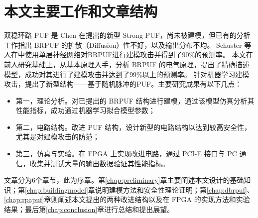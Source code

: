 \section{本文主要工作和文章结构}\label{sec:mainworks}
双稳环路 PUF 是 Chen 在\parencite{chen2011bistable}提出的新型 Strong PUF，尚未被建模，但已有的分析工作指出 BRPUF 的扩散（Diffusion）性不好，以及输出分布不均\supercite{chen2012characterization,yamamoto2014security}。
Schuster 等人在\parencite{schuster2014evaluation}中使用单层神经网络对BRPUF进行建模攻击并得到了90\%的预测率。
本文在前人研究基础上，从基本原理入手，分析 BRPUF 的电气原理，提出了精确描述模型，成功对其进行了建模攻击并达到了99\%以上的预测率。
针对机器学习建模攻击，提出了新型结构——基于随机脉冲的PUF。主要研究成果有以下几点：
\begin{itemize}
\item 第一，理论分析。对已提出的 BRPUF 结构进行建模，通过该模型仿真分析其性能指标，成功通过机器学习拟合模型参数；
\item 第二，电路结构。改进 PUF 结构，设计新型的电路结构以达到较高安全性，尤其是对建模攻击的防范；
\item 第三，仿真与实验。在 FPGA 上实现改进电路，通过 PCI-E 接口与 PC 通信，收集并测试大量的输出数据验证其性能指标。
\end{itemize}

文章分为6个章节，此为序章。第\ref{chap:preliminary}章主要阐述本文设计的基础知识；第\ref{chap:buildingmodel}章说明建模方法和安全性理论证明；第\ref{chap:dbrpuf}、\ref{chap:rpapuf}章则阐述本文提出的两种改进结构以及在 FPGA 的实现方法和实验结果；最后第\ref{chap:conclusion}章进行总结和提出展望。
